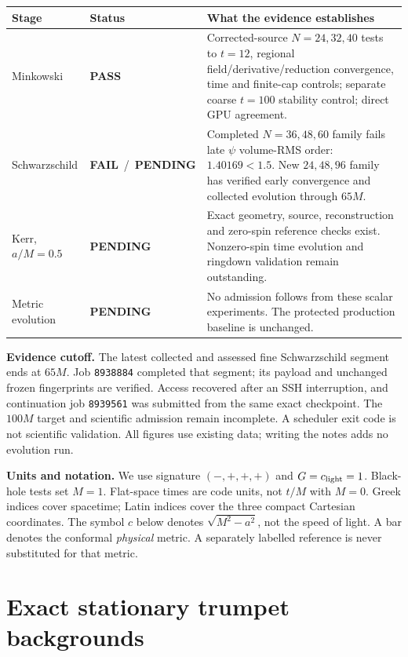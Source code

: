 \documentclass[11pt,letterpaper]{article}
\newcommand{\pass}{\textcolor{good}{\textbf{PASS}}}
\newcommand{\fail}{\textcolor{bad}{\textbf{FAIL}}}
\newcommand{\pending}{\textcolor{muted}{\textbf{PENDING}}}
\begin{document}
\begin{center}\small
\begin{tabularx}{\linewidth}{@{}p{2.8cm}p{2.3cm}X@{}}\toprule
Stage & Status & What the evidence establishes \\\midrule
Minkowski & \pass & Corrected-source $N=24,32,40$ tests to $t=12$, regional field/derivative/reduction convergence, time and finite-cap controls; separate coarse $t=100$ stability control; direct GPU agreement. \\
Schwarzschild & \fail\ /\ \pending & Completed $N=36,48,60$ family fails late $\psi$ volume-RMS order: $1.40169<1.5$. New $24,48,96$ family has verified early convergence and collected evolution through $65M$. \\
Kerr, $a/M=0.5$ & \pending & Exact geometry, source, reconstruction and zero-spin reference checks exist. Nonzero-spin time evolution and ringdown validation remain outstanding. \\
Metric evolution & \pending & No admission follows from these scalar experiments. The protected production baseline is unchanged. \\\bottomrule
\end{tabularx}
\end{center}

\textbf{Evidence cutoff.} The latest collected and assessed fine Schwarzschild segment ends at $65M$. Job \texttt{8938884} completed that segment; its payload and unchanged frozen fingerprints are verified. Access recovered after an SSH interruption, and continuation job \texttt{8939561} was submitted from the same exact checkpoint. The $100M$ target and scientific admission remain incomplete. A scheduler exit code is not scientific validation. All figures use existing data; writing the notes adds no evolution run.

\textbf{Units and notation.} We use signature $(-,+,+,+)$ and $G=c_{\rm light}=1$. Black-hole tests set $M=1$. Flat-space times are code units, not $t/M$ with $M=0$. Greek indices cover spacetime; Latin indices cover the three compact Cartesian coordinates. The symbol $c$ below denotes $\sqrt{M^2-a^2}$, not the speed of light. A bar denotes the conformal \emph{physical} metric. A separately labelled reference is never substituted for that metric.

\clearpage
\section{Exact stationary trumpet backgrounds}
\end{document}
